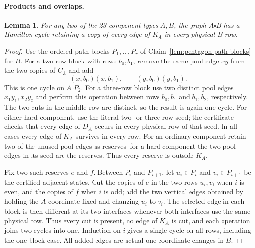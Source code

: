 \documentclass[11pt]{article}
\newtheorem{lemma}[theorem]{Lemma}
\theoremstyle{remark}
\numberwithin{equation}{section}
\numberwithin{table}{section}
\begin{document}
\paragraph{Products and overlaps.}
\begin{lemma}\label{lem:protected-product}
For any two of the 23 component types $A,B$, the graph $A\square B$
has a Hamilton cycle retaining a copy of every edge of $K_A$
in every physical $B$ row.
\end{lemma}
\begin{proof}
Use the ordered path blocks $P_1,\ldots,P_r$ of
Claim~\ref{lem:pentagon-path-blocks} for $B$.  For a two-row block
with rows $b_0,b_1$, remove the same pool edge $xy$ from the two
copies of $C_A$ and add
\[
 (x,b_0)(x,b_1),\qquad (y,b_0)(y,b_1).
\]
This is one cycle on $A\square P_2$.  For a three-row block use two
distinct pool edges $x_1y_1,x_2y_2$ and perform this operation between
rows $b_0,b_1$ and $b_1,b_2$, respectively.  The two cuts in the
middle row are distinct, so the result is again one cycle.  For either
hard component, use the literal two- or three-row seed; the
certificate checks that every edge of $D_A$ occurs in every physical
row of that seed.  In all cases every edge of $K_A$ survives in every
row.  For an ordinary component retain two of the unused pool edges
as reserves; for a hard component the two pool edges in its seed are
the reserves.  Thus every reserve is outside $K_A$.

Fix two such reserves $e$ and $f$.  Between $P_i$ and $P_{i+1}$,
let $u_i\in P_i$ and $v_i\in P_{i+1}$ be the certified adjacent
states.  Cut the copies of $e$ in the two rows $u_i,v_i$ when $i$ is
even, and the copies of $f$ when $i$ is odd; add the two vertical
edges obtained by holding the $A$-coordinate fixed and changing
$u_i$ to $v_i$.  The selected edge in each block is then different
at its two interfaces whenever both interfaces use the same physical
row.  Thus every cut is present, no edge of $K_A$ is cut, and each
operation joins two cycles into one.  Induction on $i$ gives a single
cycle on all rows, including the one-block case.  All added edges are
actual one-coordinate changes in $B$.
\end{proof}
\end{document}
